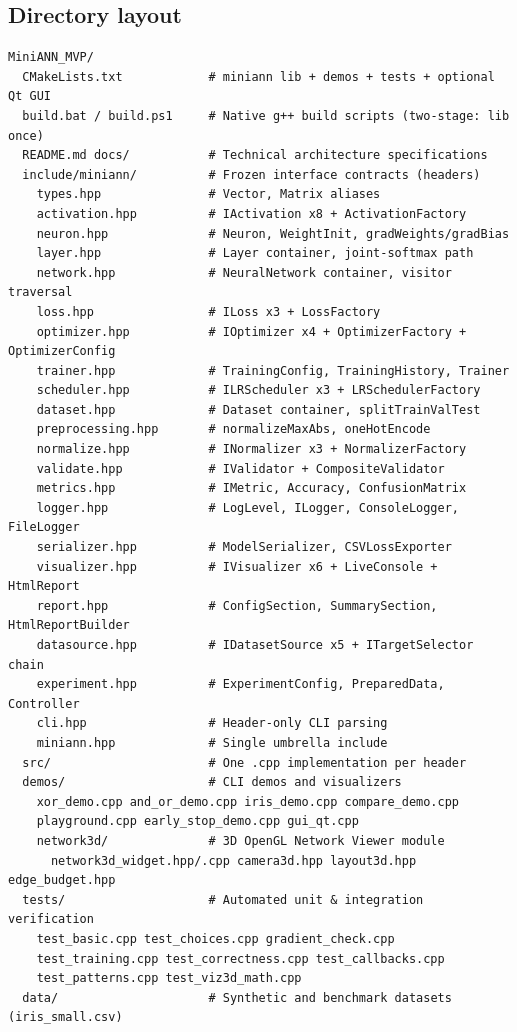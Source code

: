 \documentclass[11pt,a4paper]{article}
\begin{document}
\subsection{Directory layout}
\begin{lstlisting}
MiniANN_MVP/
  CMakeLists.txt            # miniann lib + demos + tests + optional Qt GUI
  build.bat / build.ps1     # Native g++ build scripts (two-stage: lib once)
  README.md docs/           # Technical architecture specifications
  include/miniann/          # Frozen interface contracts (headers)
    types.hpp               # Vector, Matrix aliases
    activation.hpp          # IActivation x8 + ActivationFactory
    neuron.hpp              # Neuron, WeightInit, gradWeights/gradBias
    layer.hpp               # Layer container, joint-softmax path
    network.hpp             # NeuralNetwork container, visitor traversal
    loss.hpp                # ILoss x3 + LossFactory
    optimizer.hpp           # IOptimizer x4 + OptimizerFactory + OptimizerConfig
    trainer.hpp             # TrainingConfig, TrainingHistory, Trainer
    scheduler.hpp           # ILRScheduler x3 + LRSchedulerFactory
    dataset.hpp             # Dataset container, splitTrainValTest
    preprocessing.hpp       # normalizeMaxAbs, oneHotEncode
    normalize.hpp           # INormalizer x3 + NormalizerFactory
    validate.hpp            # IValidator + CompositeValidator
    metrics.hpp             # IMetric, Accuracy, ConfusionMatrix
    logger.hpp              # LogLevel, ILogger, ConsoleLogger, FileLogger
    serializer.hpp          # ModelSerializer, CSVLossExporter
    visualizer.hpp          # IVisualizer x6 + LiveConsole + HtmlReport
    report.hpp              # ConfigSection, SummarySection, HtmlReportBuilder
    datasource.hpp          # IDatasetSource x5 + ITargetSelector chain
    experiment.hpp          # ExperimentConfig, PreparedData, Controller
    cli.hpp                 # Header-only CLI parsing
    miniann.hpp             # Single umbrella include
  src/                      # One .cpp implementation per header
  demos/                    # CLI demos and visualizers
    xor_demo.cpp and_or_demo.cpp iris_demo.cpp compare_demo.cpp
    playground.cpp early_stop_demo.cpp gui_qt.cpp
    network3d/              # 3D OpenGL Network Viewer module
      network3d_widget.hpp/.cpp camera3d.hpp layout3d.hpp edge_budget.hpp
  tests/                    # Automated unit & integration verification
    test_basic.cpp test_choices.cpp gradient_check.cpp
    test_training.cpp test_correctness.cpp test_callbacks.cpp
    test_patterns.cpp test_viz3d_math.cpp
  data/                     # Synthetic and benchmark datasets (iris_small.csv)
\end{lstlisting}
\end{document}
